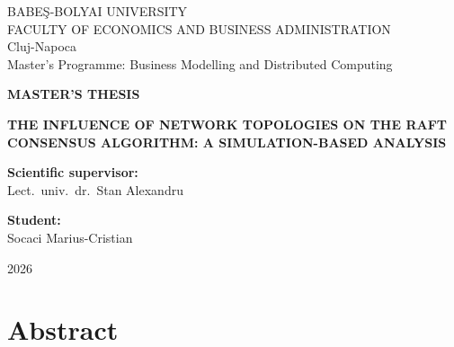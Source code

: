 \documentclass[12pt, a4paper, oneside]{report}
\begin{document}
\begin{titlepage}
    \centering
    \vspace*{1cm}

    {\large BABE\c{S}-BOLYAI UNIVERSITY}\\[0.3cm]
    {\large FACULTY OF ECONOMICS AND BUSINESS ADMINISTRATION}\\[0.3cm]
    {\large Cluj-Napoca}\\[0.5cm]
    {\large Master's Programme: Business Modelling and Distributed Computing}

    \vspace{3cm}

    {\Large \textbf{MASTER'S THESIS}}

    \vspace{1.5cm}

    {\LARGE \textbf{THE INFLUENCE OF NETWORK TOPOLOGIES ON THE RAFT CONSENSUS ALGORITHM: A SIMULATION-BASED ANALYSIS}}

    \vspace{3cm}

    \begin{minipage}{0.45\textwidth}
        \begin{flushleft}
            \textbf{Scientific supervisor:}\\
            Lect.~univ.~dr.~Stan Alexandru
        \end{flushleft}
    \end{minipage}
    \hfill
    \begin{minipage}{0.45\textwidth}
        \begin{flushright}
            \textbf{Student:}\\
            Socaci Marius-Cristian
        \end{flushright}
    \end{minipage}

    \vfill
    {\large 2026}
\end{titlepage}


\chapter*{Abstract}
\end{document}
